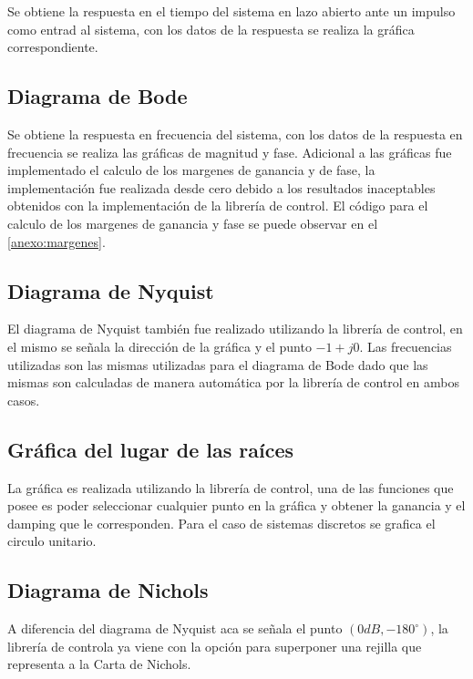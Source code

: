         Se obtiene la respuesta en el tiempo del sistema en lazo abierto ante un impulso como entrad al sistema, con los datos de la respuesta se realiza la gráfica correspondiente.

    \subsection{Diagrama de Bode}
        
        Se obtiene la respuesta en frecuencia del sistema, con los datos de la respuesta en frecuencia se realiza las gráficas de magnitud y fase. Adicional a las gráficas fue implementado el calculo de los margenes de ganancia y de fase, la implementación fue realizada desde cero debido a los resultados inaceptables obtenidos con la implementación de la librería de control. El código para el calculo de los margenes de ganancia y fase se puede observar en el \ref{anexo:margenes}.
    
    \subsection{Diagrama de Nyquist}
        
        El diagrama de Nyquist también fue realizado utilizando la librería de control, en el mismo se señala la dirección de la gráfica y el punto $-1 + j0$. Las frecuencias utilizadas son las mismas utilizadas para el diagrama de Bode dado que las mismas son calculadas de manera automática por la librería de control en ambos casos.
    
    \subsection{Gráfica del lugar de las raíces}
        
        La gráfica es realizada utilizando la librería de control, una de las funciones que posee es poder seleccionar cualquier punto en la gráfica y obtener la ganancia y el damping que le corresponden. Para el caso de sistemas discretos se grafica el circulo unitario.
    
    \subsection{Diagrama de Nichols}
        
        A diferencia del diagrama de Nyquist aca se señala el punto $(0dB, -180^\circ)$, la librería de controla ya viene con la opción para superponer una rejilla que representa a la Carta de Nichols.

